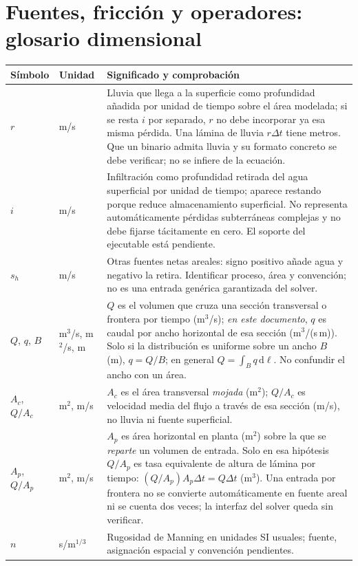 \documentclass[11pt,a4paper]{article}
\begin{document}
\section{Fuentes, fricción y operadores: glosario dimensional}
\begin{longtable}{p{.17\linewidth}p{.18\linewidth}p{.57\linewidth}}
\toprule Símbolo & Unidad & Significado y comprobación \\\midrule
$r$ & m/s & Lluvia que llega a la superficie como profundidad añadida por unidad de tiempo sobre el área modelada; si se resta $i$ por separado, $r$ no debe incorporar ya esa misma pérdida. Una lámina de lluvia $r\Delta t$ tiene metros. Que un binario admita lluvia y su formato concreto se debe verificar; no se infiere de la ecuación. \\
$i$ & m/s & Infiltración como profundidad retirada del agua superficial por unidad de tiempo; aparece restando porque reduce almacenamiento superficial. No representa automáticamente pérdidas subterráneas complejas y no debe fijarse tácitamente en cero. El soporte del ejecutable está pendiente. \\
$s_h$ & m/s & Otras fuentes netas areales: signo positivo añade agua y negativo la retira. Identificar proceso, área y convención; no es una entrada genérica garantizada del solver. \\
$Q$, $q$, $B$ & m$^3$/s, m$^2$/s, m & $Q$ es el volumen que cruza una sección transversal o frontera por tiempo (m$^3$/s); \emph{en este documento}, $q$ es caudal por ancho horizontal de esa sección (m$^3$/(s\,m)). Solo si la distribución es uniforme sobre un ancho $B$ (m), $q=Q/B$; en general $Q=\int_B q\,\mathrm d\ell$. No confundir el ancho con un área. \\
$A_c$, $Q/A_c$ & m$^2$, m/s & $A_c$ es el área transversal \emph{mojada} (m$^2$); $Q/A_c$ es velocidad media del flujo a través de esa sección (m/s), no lluvia ni fuente superficial. \\
$A_p$, $Q/A_p$ & m$^2$, m/s & $A_p$ es área horizontal en planta (m$^2$) sobre la que se \emph{reparte} un volumen de entrada. Solo en esa hipótesis $Q/A_p$ es tasa equivalente de altura de lámina por tiempo: $(Q/A_p)A_p\Delta t=Q\Delta t$ (m$^3$). Una entrada por frontera no se convierte automáticamente en fuente areal ni se cuenta dos veces; la interfaz del solver queda sin verificar. \\
$n$ & s/m$^{1/3}$ & Rugosidad de Manning en unidades SI usuales; fuente, asignación espacial y convención pendientes. \\

\end{longtable}
\end{document}
